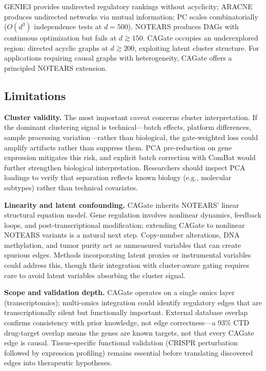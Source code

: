 \documentclass[12pt,a4paper]{article}
\begin{document}
GENIE3 \cite{HuynhThu2010} provides undirected regulatory rankings without acyclicity; ARACNE \cite{Margolin2006} produces undirected networks via mutual information; PC \cite{Spirtes2000} scales combinatorially ($O(d^3)$ independence tests at $d=500$). NOTEARS produces DAGs with continuous optimization but fails at $d \gtrsim 150$. CAGate occupies an underexplored region: directed acyclic graphs at $d \gtrsim 200$, exploiting latent cluster structure. For applications requiring causal graphs with heterogeneity, CAGate offers a principled NOTEARS extension.









\subsection{Limitations}









\textbf{Cluster validity.} The most important caveat concerns cluster interpretation. If the dominant clustering signal is technical---batch effects, platform differences, sample processing variation---rather than biological, the gate-weighted loss could amplify artifacts rather than suppress them. PCA pre-reduction on gene expression mitigates this risk, and explicit batch correction with ComBat \cite{Johnson2007} would further strengthen biological interpretation. Researchers should inspect PCA loadings to verify that separation reflects known biology (e.g., molecular subtypes) rather than technical covariates.

\textbf{Linearity and latent confounding.} CAGate inherits NOTEARS' linear structural equation model. Gene regulation involves nonlinear dynamics, feedback loops, and post-transcriptional modification; extending CAGate to nonlinear NOTEARS variants \cite{Zheng2018,Zheng2020} is a natural next step. Copy-number alterations, DNA methylation, and tumor purity act as unmeasured variables that can create spurious edges. Methods incorporating latent proxies or instrumental variables \cite{Frot2020} could address this, though their integration with cluster-aware gating requires care to avoid latent variables absorbing the cluster signal.

\textbf{Scope and validation depth.} CAGate operates on a single omics layer (transcriptomics); multi-omics integration could identify regulatory edges that are transcriptionally silent but functionally important. External database overlap confirms consistency with prior knowledge, not edge correctness---a 93\% CTD drug-target overlap means the genes are known targets, not that every CAGate edge is causal. Tissue-specific functional validation (CRISPR perturbation followed by expression profiling) remains essential before translating discovered edges into therapeutic hypotheses.
\end{document}
